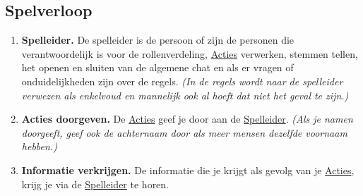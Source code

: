 \documentclass{article}
\newenvironment{rulesubsection}[1]{
    \subsection{#1} \label{rule:#1}
    \begin{enumerate}[label=\thesubsection.\arabic{enumi}]
}{
    \end{enumerate}
}
\newcommand{\ruleitem}[1]{\item \label{rule:#1} \textbf{#1.}}
\newcommand{\ruleref}[1]{\hyperref[rule:#1]{#1}}
\begin{document}
\begin{rulesubsection}{Spelverloop}
    \ruleitem{Spelleider} De spelleider is de persoon of zijn de personen die verantwoordelijk is voor de rollenverdeling,
    \ruleref{Acties} verwerken, stemmen tellen, het openen en sluiten van de algemene chat en als er vragen of onduidelijkheden zijn over de regels.
    \textit{(In de regels wordt naar de spelleider verwezen als enkelvoud en mannelijk ook al hoeft dat niet het geval te zijn.)}
    \ruleitem{Acties doorgeven} De \ruleref{Acties} geef je door aan de \ruleref{Spelleider}. \textit{(Als je namen doorgeeft, geef ook de achternaam door
    als meer mensen dezelfde voornaam hebben.)}
    \ruleitem{Informatie verkrijgen} De informatie die je krijgt als gevolg van je \ruleref{Acties}, krijg je via de \ruleref{Spelleider} te horen.
\end{rulesubsection}
\end{document}
